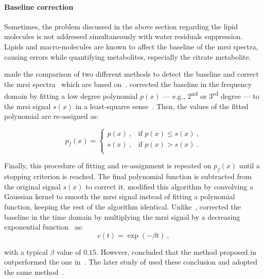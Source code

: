 \paragraph{Baseline correction} Sometimes, the problem discussed in the above section regarding the lipid molecules is not addressed simultaneously with water residuals suppression.
Lipids and macro-molecules are known to affect the baseline of the \ac{mrsi} spectra, causing errors while quantifying metabolites, especially the citrate metabolite.

\citeauthor{Parfait2012} made the comparison of two different methods to detect the baseline and correct the \ac{mrsi} spectra~\cite{Parfait2012} which are based on~\cite{Lieber2003,Devos2004}.
\citeauthor{Lieber2003} corrected the baseline in the frequency domain by fitting a low degree polynomial $p(x)$ --- e.g., 2\textsuperscript{nd} or 3\textsuperscript{rd} degree --- to the \ac{mrsi} signal $s(x)$ in a least-squares sense~\cite{Lieber2003}.
Then, the values of the fitted polynomial are re-assigned as:

\begin{equation}
	p_f(x) = 
	\begin{cases}
		p(x) \ , & \text{if $p(x) \leq s(x)$} \ , \\
		s(x) \ , & \text{if $p(x) > s(x)$} \ . \\
	\end{cases}
	\label{eq:lieber}
\end{equation}

Finally, this procedure of fitting and re-assignment is repeated on $p_f(x)$ until a stopping criterion is reached.
The final polynomial function is subtracted from the original signal $s(x)$ to correct it.
\cite{Parfait2012} modified this algorithm by convolving a Gaussian kernel to smooth the \ac{mrsi} signal instead of fitting a polynomial function, keeping the rest of the algorithm identical. 
Unlike~\citeauthor{Lieber2003}, \citeauthor{Devos2004} corrected the baseline in the time domain by multiplying the \ac{mrsi} signal by a decreasing exponential function~\cite{Devos2004} as:
\begin{equation}
	c(t) = \exp (- \beta t) \ ,
	\label{eq:devos}
\end{equation}

\noindent with a typical $\beta$ value of $0.15$.
However, \citeauthor{Parfait2012} concluded that the method proposed in~\cite{Lieber2003} outperformed the one in~\cite{Devos2004}.
The later study of \citeauthor{trigui2017automatic} used these conclusion and adopted the same method~\cite{trigui2016classification,trigui2017automatic}.

